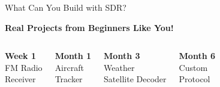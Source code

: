 \documentclass[aspectratio=169,11pt]{beamer}
\begin{document}
\begin{frame}{What Can You Build with SDR?}
\begin{center}
\Large\textbf{Real Projects from Beginners Like You!}
\end{center}
\vspace{1em}
\begin{columns}
\begin{center}
\textcolor{radioblue}{\Large\textbf{Week 1}}\\
FM Radio\\
Receiver
\end{center}

\begin{center}
\textcolor{radiogreen}{\Large\textbf{Month 1}}\\
Aircraft\\
Tracker
\end{center}

\begin{center}
\textcolor{radioorange}{\Large\textbf{Month 3}}\\
Weather\\
Satellite Decoder
\end{center}

\begin{center}
\textcolor{radiopurple}{\Large\textbf{Month 6}}\\
Custom\\
Protocol
\end{center}
\end{columns}

\vspace{2em}
\begin{center}
\end{center}
\end{frame}
\end{document}
